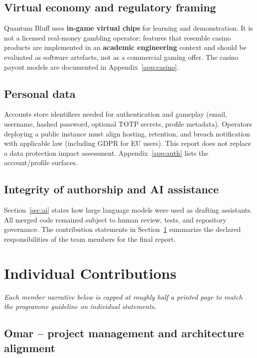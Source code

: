 \documentclass[11pt,a4paper]{article}
\begin{document}
\subsection{Virtual economy and regulatory framing}

Quantum Bluff uses \textbf{in-game virtual chips} for learning and demonstration. It is not a licensed real-money gambling operator; features that resemble casino products are implemented in an \textbf{academic engineering} context and should be evaluated as software artefacts, not as a commercial gaming offer. The casino payout models are documented in Appendix~\ref{app:casino}.

\subsection{Personal data}

Accounts store identifiers needed for authentication and gameplay (email, username, hashed password, optional TOTP secrets, profile metadata). Operators deploying a public instance must align hosting, retention, and breach notification with applicable law (including GDPR for EU users). This report does not replace a data protection impact assessment. Appendix~\ref{app:auth} lists the account/profile surfaces.

\subsection{Integrity of authorship and AI assistance}

Section~\ref{sec:ai} states how large language models were used as drafting assistants. All merged code remained subject to human review, tests, and repository governance. The contribution statements in Section~\ref{sec:contributions} summarize the declared responsibilities of the team members for the final report.

\section{Individual Contributions}
\label{sec:contributions}

\noindent\textit{Each member narrative below is capped at roughly half a printed page to match the programme guideline on individual statements.}

\subsection{Omar -- project management and architecture alignment}
\end{document}
